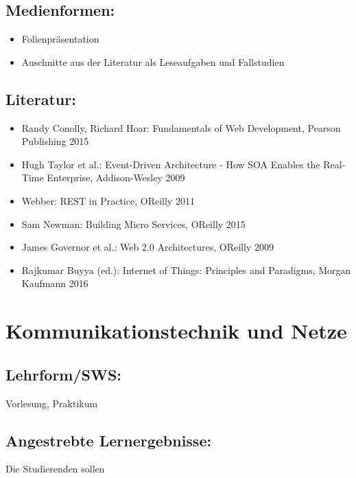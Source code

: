 \section*{Medienformen:}\label{medienformen-4}

\begin{itemize}
\item
  Folienpräsentation
\item
  Auschnitte aus der Literatur als Leseaufgaben und Fallstudien
\end{itemize}

\section*{Literatur:}\label{literatur-8}

\begin{itemize}
\item
  Randy Conolly, Richard Hoar: Fundamentals of Web Development, Pearson
  Publishing 2015
\item
  Hugh Taylor et al.: Event-Driven Architecture - How SOA Enables the
  Real-Time Enterprise, Addison-Wesley 2009
\item
  Webber: REST in Practice, OReilly 2011
\item
  Sam Newman: Building Micro Services, OReilly 2015
\item
  James Governor et al.: Web 2.0 Architectures, OReilly 2009
\item
  Rajkumar Buyya (ed.): Internet of Things: Principles and Paradigms,
  Morgan Kaufmann 2016
\end{itemize}

\chapter{Kommunikationstechnik und
Netze}\label{kommunikationstechnik-und-netze}

\section*{Lehrform/SWS:}\label{lehrformsws-8}

Vorlesung, Praktikum

\section*{Angestrebte
Lernergebnisse:}\label{angestrebte-lernergebnisse-12}

Die Studierenden sollen


